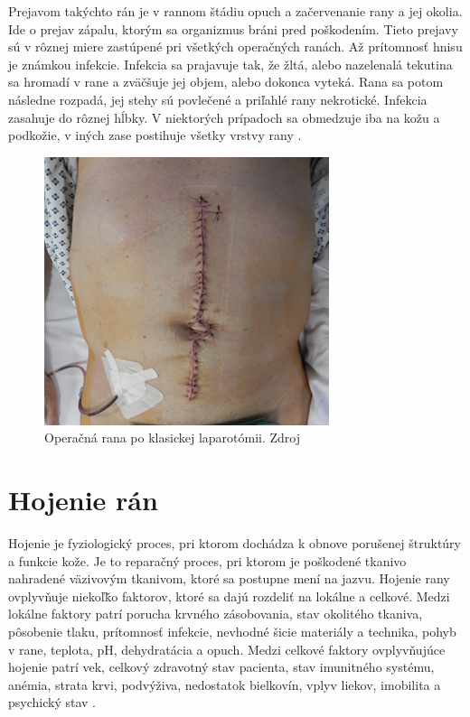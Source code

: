 Prejavom takýchto rán je v rannom štádiu opuch a začervenanie rany a jej okolia. Ide o prejav zápalu, ktorým sa organizmus bráni pred poškodením. Tieto prejavy sú v rôznej miere zastúpené pri všetkých operačných ranách. Až prítomnosť hnisu je známkou infekcie. Infekcia sa prajavuje tak, že žltá, alebo nazelenalá tekutina sa hromadí v rane a zväčšuje jej objem, alebo dokonca vyteká. Rana sa potom následne rozpadá, jej stehy sú povlečené a priľahlé rany nekrotické. Infekcia zasahuje do rôznej hĺbky. V niektorých prípadoch sa obmedzuje iba na kožu a podkožie, v iných zase postihuje všetky vrstvy rany \cite{pcCdSrbbhhlr5YcQ}.
\begin{figure}[h]
  \centering
  \includegraphics[scale=1]{fig/pooperacna-rana.png}
  \caption{Operačná rana po klasickej laparotómii. Zdroj \cite{XUKYT8x1LmEzzkqO}}
  \label{fig:pooperacna-rana}
\end{figure}

\section{Hojenie rán}
Hojenie je fyziologický proces, pri ktorom dochádza k obnove porušenej štruktúry a funkcie kože. Je to reparačný proces, pri ktorom je poškodené tkanivo nahradené väzivovým tkanivom, ktoré sa postupne mení na jazvu. Hojenie rany ovplyvňuje niekoľǩo faktorov, ktoré sa dajú rozdeliť na lokálne a celkové. Medzi lokálne faktory patrí porucha krvného zásobovania, stav okolitého tkaniva, pôsobenie tlaku, prítomnosť infekcie, nevhodné šicie materiály a technika, pohyb v rane, teplota, pH, dehydratácia a opuch. Medzi celkové faktory ovplyvňujúce hojenie patrí vek, celkový zdravotný stav pacienta, stav imunitného systému, anémia, strata krvi, podvýživa, nedostatok bielkovín, vplyv liekov, imobilita a psychický stav \cite{pcCdSrbbhhlr5YcQ, Pokorna2012}.

